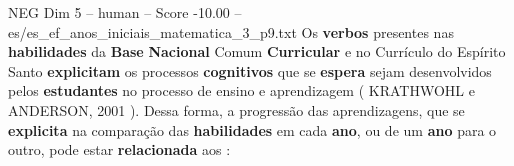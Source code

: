 \begin{textsample}{NEG Dim 5 – human – Score -10.00 – es/es\_ef\_anos\_iniciais\_matematica\_3\_p9.txt}  \label{ex:f5_neg_007}
Os \textbf{verbos} presentes nas \textbf{habilidades} da \textbf{Base} \textbf{Nacional} Comum \textbf{Curricular} e no Currículo do Espírito Santo \textbf{explicitam} os processos \textbf{cognitivos} que se \textbf{espera} sejam desenvolvidos pelos \textbf{estudantes} no processo de ensino e aprendizagem ( KRATHWOHL e ANDERSON, 2001 ).
Dessa forma, a progressão das aprendizagens, que se \textbf{explicita} na comparação das \textbf{habilidades} em cada \textbf{ano}, ou de um \textbf{ano} para o outro, pode estar \textbf{relacionada} aos :

\end{textsample}

